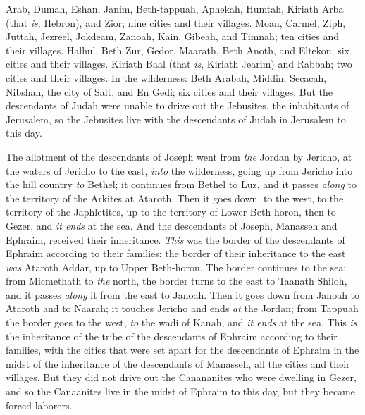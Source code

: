 \begin{biblechapter}
\verse Arab, Dumah, Eshan,
\verse Janim, Beth-tappuah, Aphekah,
\verse Humtah, Kiriath Arba (that \textit{is}, Hebron), and Zior; nine cities and their villages.
\verse Moan, Carmel, Ziph, Juttah,
\verse Jezreel, Jokdeam, Zanoah,
\verse Kain, Gibeah, and Timnah; ten cities and their villages.
\verse Halhul, Beth Zur, Gedor,
\verse Maarath, Beth Anoth, and Eltekon; six cities and their villages.
\verse Kiriath Baal (that \textit{is}, Kiriath Jearim) and Rabbah; two cities and their villages.
\verse In the wilderness: Beth Arabah, Middin, Secacah,
\verse Nibshan, the city of Salt, and En Gedi; six cities and their villages.
\verse But the descendants of Judah were unable to drive out the Jebusites, the inhabitants of Jerusalem, so the Jebusites live with the descendants of Judah in Jerusalem to this day.
\end{biblechapter}

\begin{biblechapter} %
 The allotment of the descendants of Joseph went from \textit{the} Jordan by Jericho, at the waters of Jericho to the east, \textit{into} the wilderness, going up from Jericho into the hill country \textit{to} Bethel;
\verse it continues from Bethel to Luz, and it passes \textit{along} to the territory of the Arkites at Ataroth.
\verse Then it goes down, to the west, to the territory of the Japhletites, up to the territory of Lower Beth-horon, then to Gezer, and \textit{it ends} at the sea.
\verse And the descendants of Joseph, Manasseh and Ephraim, received their inheritance.
\verse \textit{This} was the border of the descendants of Ephraim according to their families: the border of their inheritance to the east \textit{was} Ataroth Addar, up to Upper Beth-horon.
\verse The border continues to the sea; from Micmethath to \textit{the} north, the border turns to the east to Taanath Shiloh, and it passes \textit{along} it from the east to Janoah.
\verse Then it goes down from Janoah to Ataroth and to Naarah; it touches Jericho and ends \textit{at} the Jordan;
\verse from Tappuah the border goes to the west, \textit{to} the wadi of Kanah, and \textit{it ends} at the sea. This \textit{is} the inheritance of the tribe of the descendants of Ephraim according to their families,
\verse with the cities that were set apart for the descendants of Ephraim in the midst of the inheritance of the descendants of Manasseh, all the cities and their villages.
\verse But they did not drive out the Canananites who were dwelling in Gezer, and so the Canaanites live in the midst of Ephraim to this day, but they became forced laborers.
\end{biblechapter}

